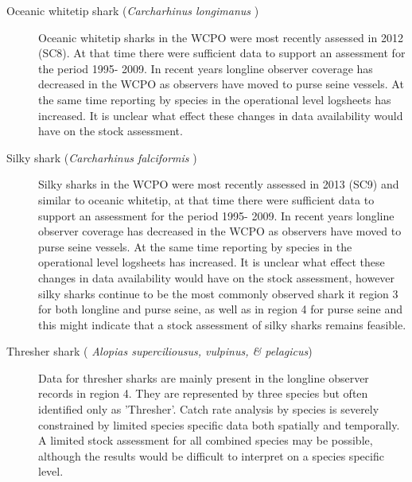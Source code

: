 \documentclass[12pt]{SCreport}
\begin{document}
\begin{description}
 
 \item[Oceanic whitetip shark (\emph{Carcharhinus longimanus} ) ] Oceanic whitetip sharks in the WCPO were most recently assessed in 2012 (SC8). At that time there were sufficient data to support an assessment for the period 1995- 2009.  In recent years longline observer coverage has decreased in the WCPO as observers have moved to purse seine vessels.  At the same time reporting by species in the operational level logsheets has increased.  It is unclear what effect these changes in data availability would have on the stock assessment. 

\item[Silky  shark (\emph{Carcharhinus falciformis} ) ] Silky sharks in the WCPO were most recently assessed in 2013 (SC9) and similar to oceanic whitetip, at that time there were sufficient data to support an assessment for the period 1995- 2009.  In recent years longline observer coverage has decreased in the WCPO as observers have moved to purse seine vessels.  At the same time reporting by species in the operational level logsheets has increased.  It is unclear what effect these changes in data availability would have on the stock assessment, however silky sharks continue to be the most commonly observed shark it region 3 for both longline and purse seine, as well as in region 4 for purse seine and this might indicate that a stock assessment of silky sharks remains feasible.

\item[ Thresher shark (\emph{ Alopias superciliousus, vulpinus, \& pelagicus}) ]  Data for thresher sharks are mainly present in the longline observer records in region 4. %
They are represented by three species but often identified only as 'Thresher'.   Catch rate analysis by species is severely constrained by limited species specific data both spatially and temporally.  A limited stock assessment for all combined species may be possible, although the results would be difficult to interpret on a species specific level.


\end{description}
\end{document}
